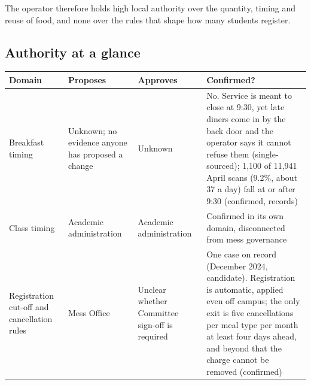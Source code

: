 \documentclass[
  10pt,
  table]{article}
\newcounter{none} %
\begin{document}
The operator therefore holds high local authority over the quantity, timing and reuse of food, and none over the rules that shape how many students register.

\subsection{Authority at a glance}\label{authority-at-a-glance}

{\def\LTcaptype{none} %
\begin{longtable}[]{@{}
  >{\raggedright\arraybackslash}p{}
  >{\raggedright\arraybackslash}p{}
  >{\raggedright\arraybackslash}p{}
  >{\raggedright\arraybackslash}p{}@{}}
\toprule\noalign{}
\begin{minipage}[b]{\linewidth}\raggedright
\cellcolor{pblue}\color{white}\bfseries Domain
\end{minipage} & \begin{minipage}[b]{\linewidth}\raggedright
\cellcolor{pblue}\color{white}\bfseries Proposes
\end{minipage} & \begin{minipage}[b]{\linewidth}\raggedright
\cellcolor{pblue}\color{white}\bfseries Approves
\end{minipage} & \begin{minipage}[b]{\linewidth}\raggedright
\cellcolor{pblue}\color{white}\bfseries Confirmed?
\end{minipage} \\
\midrule\noalign{}
\endhead
\bottomrule\noalign{}
\endlastfoot
Breakfast timing & Unknown; no evidence anyone has proposed a change & Unknown & No. Service is meant to close at 9:30, yet late diners come in by the back door and the operator says it cannot refuse them (single-sourced); 1,100 of 11,941 April scans (9.2\%, about 37 a day) fall at or after 9:30 (confirmed, records) \\
Class timing & Academic administration & Academic administration & Confirmed in its own domain, disconnected from mess governance \\
Registration cut-off and cancellation rules & Mess Office & Unclear whether Committee sign-off is required & One case on record (December 2024, candidate). Registration is automatic, applied even off campus; the only exit is five cancellations per meal type per month at least four days ahead, and beyond that the charge cannot be removed (confirmed) \\

\end{longtable}}
\end{document}
